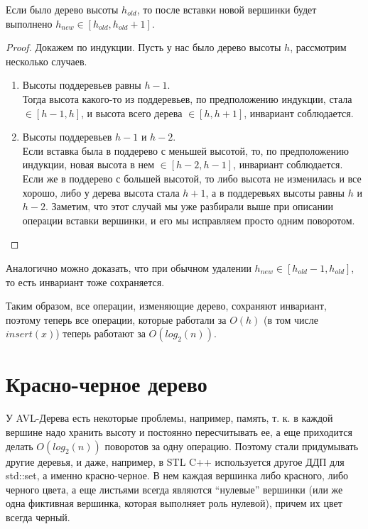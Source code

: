 \begin{proposition}
    Если было дерево высоты $h_{old}$, то после вставки новой вершинки будет выполнено $h_{new} \in [h_{old}, h_{old}+1]$.
\end{proposition}
\begin{proof}
    Докажем по индукции. Пусть у нас было дерево высоты $h$, рассмотрим несколько случаев.
    \begin{enumerate}
        \item Высоты поддеревьев равны $h-1$. \\
        Тогда высота какого-то из поддеревьев, по предположению индукции, стала $\in [h-1, h]$, и высота всего дерева $\in [h, h+1]$, инвариант соблюдается.
        \item Высоты поддеревьев $h-1$ и $h-2$. \\
        Если вставка была в поддерево с меньшей высотой, то, по предположению индукции, новая высота в нем $\in [h-2, h-1]$, инвариант соблюдается. Если же в поддерево с большей высотой, то либо высота не изменилась и все хорошо, либо у дерева высота стала $h+1$, а в поддеревьях высоты равны $h$ и $h-2$. Заметим, что этот случай мы уже разбирали выше при описании операции вставки вершинки, и его мы исправляем просто одним поворотом.
    \end{enumerate}
\end{proof}

\begin{note}
    Аналогично можно доказать, что при обычном удалении $h_{new} \in [h_{old}-1, h_{old}]$, то есть инвариант тоже сохраняется.
\end{note}

Таким образом, все операции, изменяющие дерево, сохраняют инвариант, поэтому теперь все операции, которые работали за $O(h)$ (в том числе $insert(x)$) теперь работают за $O(log_2(n))$.



\section{Красно-черное дерево}



У AVL-Дерева есть некоторые проблемы, например, память, т. к. в каждой вершине надо хранить высоту и постоянно пересчитывать ее, а еще приходится делать $O(log_2(n))$ поворотов за одну операцию. Поэтому стали придумывать другие деревья, и даже, например, в STL C++ используется другое ДДП для std::set, а именно красно-черное. В нем каждая вершинка либо красного, либо черного цвета, а еще листьями всегда являются ``нулевые'' вершинки (или же одна фиктивная вершинка, которая выполняет роль нулевой), причем их цвет всегда черный.

